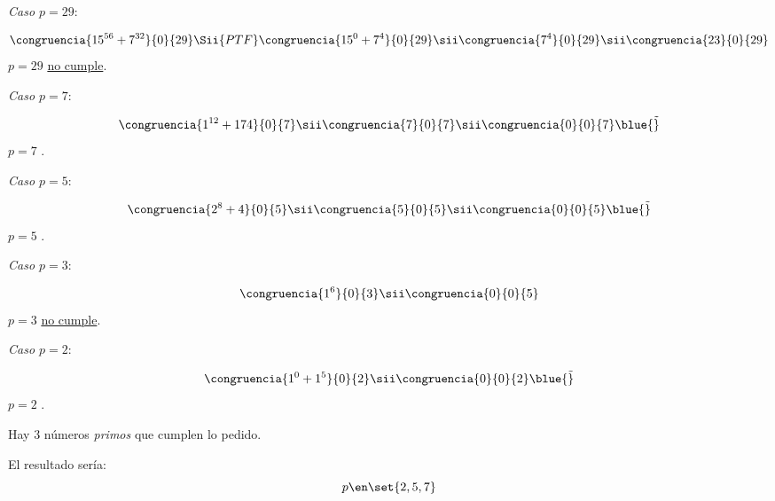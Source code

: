 \begin{enumerate}[label={\tiny \magenta{\faIcon[regular]{gamepad}}}]
  \item
        \textit{Caso $p = 29$}:\par
        $$
          \congruencia{15^{56} + 7^{32} }{0}{29}
          \Sii{PTF}
          \congruencia{15^{0} + 7^{4} }{0}{29}
          \sii
          \congruencia{7^{4}}{0}{29}
          \sii
          \congruencia{23}{0}{29}
        $$
        $p = 29$ \underline{no cumple}.

  \item
        \textit{Caso $p = 7$}:\par
        $$
          \congruencia{1^{12} + 174}{0}{7}
          \sii
          \congruencia{7}{0}{7}
          \sii
          \congruencia{0}{0}{7} \blue{\Tilde}
        $$
        $p = 7$ .

  \item

        \textit{Caso $p = 5$}:\par
        $$
          \congruencia{ 2^8 + 4}{0}{5}
          \sii
          \congruencia{5}{0}{5}
          \sii
          \congruencia{0}{0}{5} \blue{\Tilde}
        $$
        $p = 5$ .

  \item
        \textit{Caso $p = 3$}:\par
        $$
          \congruencia{1^6}{0}{3}
          \sii
          \congruencia{0}{0}{5}
        $$
        $p = 3$ \underline{no cumple}.

  \item
        \textit{Caso $p = 2$}:\par
        $$
          \congruencia{1^0 + 1^5}{0}{2}
          \sii
          \congruencia{0}{0}{2} \blue{\Tilde}
        $$
        $p = 2$ .
\end{enumerate}

Hay 3 números \textit{primos} que cumplen lo pedido.

\bigskip

El resultado sería:
$$
  p \en \set{2, 5, 7}
$$

\begin{aportes}
  \item {}
\end{aportes}
